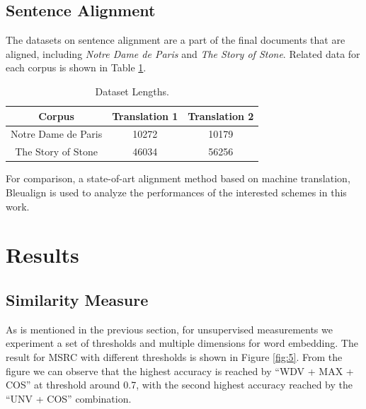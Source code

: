 \documentclass[runningheads]{llncs}
\begin{document}
\subsection{Sentence Alignment}

The datasets on sentence alignment are a part of the final documents that are aligned, including \emph{Notre Dame de Paris} and \emph{The Story of Stone}. Related data for each corpus is shown in Table \ref{tb:1}.

\begin{table}[h!]\footnotesize
	\centering
	\small
	\caption{Dataset Lengths.}\label{tb:1}
	\begin{tabular}{|c|c|c|}
		\hline
		Corpus & Translation 1 & Translation 2 \\
		\hline
		Notre Dame de Paris & 10272 & 10179 \\
		The Story of Stone & 46034 & 56256 \\
		\hline
	\end{tabular}
\end{table}

For comparison, a state-of-art alignment method based on machine translation, Bleualign is used to analyze the performances of the interested schemes in this work.

\section{Results}

\subsection{Similarity Measure}

As is mentioned in the previous section, for unsupervised measurements we experiment a set of thresholds and multiple dimensions for word embedding. The result for MSRC with different thresholds is shown in Figure \ref{fig:5}. From the figure we can observe that the highest accuracy is reached by ``WDV + MAX + COS'' at threshold around 0.7, with the second highest accuracy reached by the ``UNV + COS'' combination. 
\end{document}
